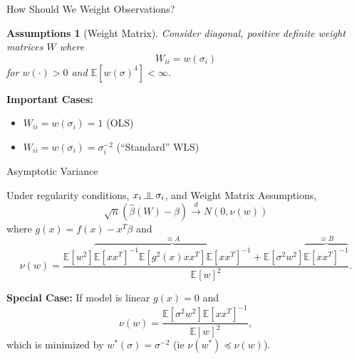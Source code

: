\documentclass[12pt]{beamer}
\newcommand{\E}{\mathbb{E}}
\newcommand{\rightarrowd}{\overset{d}{\to}}
\newcommand{\indep}{\rotatebox[origin=c]{90}{$\models$}}
\newtheorem{assumptions}{Assumptions}
\begin{document}
\begin{frame}{How Should We Weight Observations?}

  
  \begin{assumptions}[Weight Matrix]
  Consider diagonal, positive definite weight matrices $W$ where
  \begin{equation*}
    W_{ii} = w(\sigma_i)
  \end{equation*}
  for $w(\cdot) > 0$ and $\E[w(\sigma)^4] < \infty$.
  \end{assumptions}

  \vspace{.2in}
  
  \textbf{Important Cases:}
  \begin{itemize}
  \item $W_{ii} = w(\sigma_{i}) = 1$ (OLS)
  \item $W_{ii} = w(\sigma_{i}) = \sigma_{i}^{-2}$ (``Standard'' WLS)
  \end{itemize}
\end{frame}

\begin{frame}{Asymptotic Variance}

  \vspace{-.05in}
  
  \begin{theorem}
    Under regularity conditions, $x_i \, \indep \, \sigma_i$, and Weight Matrix Assumptions,
  \begin{equation*}
    \sqrt{n}(\widehat{\beta}(W) - \beta) \rightarrowd N(0,\nu(w))
  \end{equation*}
where $g(x) = f(x) - x^T\beta$ and
  \begin{equation*}
    \nu(w) = \frac{\E[w^2]\overbrace{\E[xx^T]^{-1}\E[g^2(x)xx^T]\E[xx^T]^{-1}}^{\equiv A} + \E[\sigma^2w^2]\overbrace{\E[xx^T]^{-1}}^{\equiv B}}{\E[w]^2}.
  \end{equation*}
  \end{theorem}

  \vspace{-.05in}
  
  \textbf{Special Case:}
   If model is linear $g(x)=0$ and
    \begin{equation*}
      \nu(w) = \frac{\E[\sigma^2w^2]\E[xx^T]^{-1}}{\E[w]^2},
    \end{equation*}
   which is minimized by $w^*(\sigma) = \sigma^{-2}$ (ie $\nu(w^*) \preceq \nu(w)$).
  
\end{frame}
\end{document}

